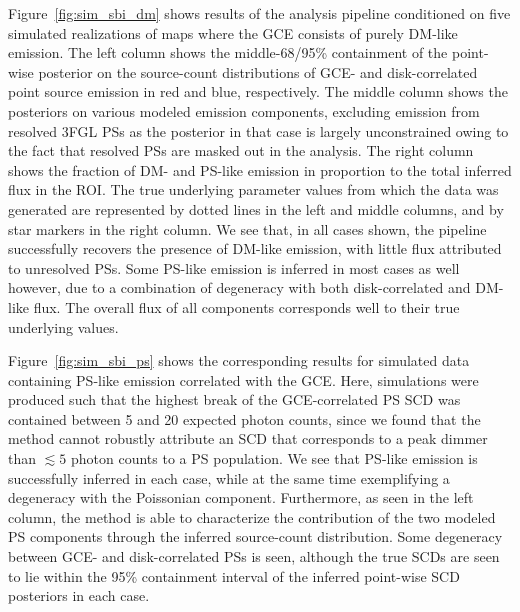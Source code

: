 \documentclass[prd,aps,10pt,nofootinbib,twocolumn,superscriptaddress,preprintnumbers,balancelastpage,longbibliography]{revtex4-1}
\begin{document}
Figure~\ref{fig:sim_sbi_dm} shows results of the analysis pipeline conditioned on five simulated realizations of maps where the GCE consists of purely DM-like emission. The left column shows the middle-68/95\% containment of the point-wise posterior on the source-count distributions of GCE- and disk-correlated point source emission in red and blue, respectively. The middle column shows the posteriors on various modeled emission components, excluding emission from resolved 3FGL PSs as the posterior in that case is largely unconstrained owing to the fact that resolved PSs are masked out in the analysis. The right column shows the fraction of DM- and PS-like emission in proportion to the total inferred flux in the ROI. The true underlying parameter values from which the data was generated are represented by dotted lines in the left and middle columns, and by star markers in the right column. We see that, in all cases shown, the pipeline successfully recovers the presence of DM-like emission, with little flux attributed to unresolved PSs. Some PS-like emission is inferred in most cases as well however, due to a combination of degeneracy with both disk-correlated and DM-like flux. The overall flux of all components corresponds well to their true underlying values.

Figure~\ref{fig:sim_sbi_ps} shows the corresponding results for simulated data containing PS-like emission correlated with the GCE. Here, simulations were produced such that the highest break of the GCE-correlated PS SCD was contained between 5 and 20 expected photon counts, since we found that the method cannot robustly attribute an SCD that corresponds to a peak dimmer than $\lesssim5$ photon counts to a PS population. We see that PS-like emission is successfully inferred in each case, while at the same time exemplifying a degeneracy with the Poissonian component. Furthermore, as seen in the left column, the method is able to characterize the contribution of the two modeled PS components through the inferred source-count distribution. Some degeneracy between GCE- and disk-correlated PSs is seen, although the true SCDs are seen to lie within the 95\% containment interval of the inferred point-wise SCD posteriors in each case.
\end{document}

